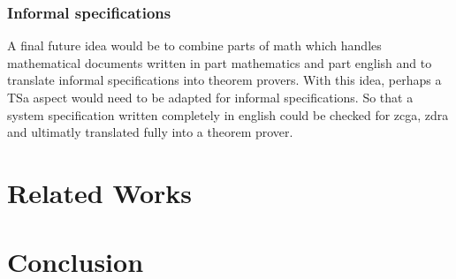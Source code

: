 \subsubsection{Informal specifications}

A final future idea would be to combine parts of \gls{math} which handles mathematical documents written in part mathematics and part english and to translate informal specifications into theorem provers. With this idea, perhaps a TSa aspect would need to be adapted for informal specifications. So that a system specification written completely in english could be checked for \gls{zcga}, \gls{zdra} and ultimatly translated fully into a theorem prover.

\section{Related Works}
\label{sec:relatedworks}

\section{Conclusion}
\label{sec:conclusion}